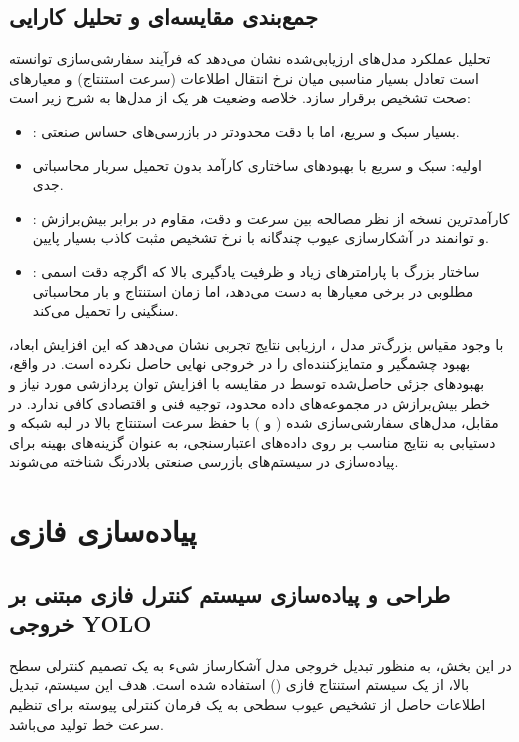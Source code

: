 \documentclass[a4paper, 10pt, twocolumn]{article}
\begin{document}
	
	\subsection{جمع‌بندی مقایسه‌ای و تحلیل کارایی}
	
	تحلیل عملکرد مدل‌های ارزیابی‌شده نشان می‌دهد که فرآیند سفارشی‌سازی توانسته است تعادل بسیار مناسبی میان نرخ انتقال اطلاعات (سرعت استنتاج) و معیارهای صحت تشخیص برقرار سازد. خلاصه‌ وضعیت هر یک از مدل‌ها به شرح زیر است:
	\begin{itemize}
		\item {}: بسیار سبک و سریع، اما با دقت محدودتر در بازرسی‌های حساس صنعتی.
		\item {} اولیه: سبک و سریع با بهبودهای ساختاری کارآمد بدون تحمیل سربار محاسباتی جدی.
		\item {}: کارآمدترین نسخه از نظر مصالحه بین سرعت و دقت، مقاوم در برابر بیش‌برازش و توانمند در آشکارسازی عیوب چندگانه با نرخ تشخیص مثبت کاذب بسیار پایین.
		\item {}: ساختار بزرگ با پارامترهای زیاد و ظرفیت یادگیری بالا که اگرچه دقت اسمی مطلوبی در برخی معیارها به دست می‌دهد، اما زمان استنتاج و بار محاسباتی سنگینی را تحمیل می‌کند.
	\end{itemize}
	
	با وجود مقیاس بزرگ‌تر مدل ، ارزیابی نتایج تجربی نشان می‌دهد که این افزایش ابعاد، بهبود چشمگیر و متمایزکننده‌ای را در خروجی نهایی حاصل نکرده است. در واقع، بهبودهای جزئی حاصل‌شده توسط  در مقایسه با افزایش توان پردازشی مورد نیاز و خطر بیش‌برازش در مجموعه‌های داده محدود، توجیه فنی و اقتصادی کافی ندارد. در مقابل، مدل‌های سفارشی‌سازی شده ( و ) با حفظ سرعت استنتاج بالا در لبه شبکه و دستیابی به نتایج مناسب بر روی داده‌های اعتبارسنجی، به عنوان گزینه‌های بهینه برای پیاده‌سازی در سیستم‌های بازرسی صنعتی بلادرنگ شناخته می‌شوند.
	
	
	
	
	\section{پیاده‌سازی فازی}
	\subsection{طراحی و پیاده‌سازی سیستم کنترل فازی مبتنی بر خروجی YOLO}
	
	در این بخش، به منظور تبدیل خروجی مدل آشکارساز شیء به یک تصمیم کنترلی سطح بالا، از یک سیستم استنتاج فازی () استفاده شده است. هدف این سیستم، تبدیل اطلاعات حاصل از تشخیص عیوب سطحی به یک فرمان کنترلی پیوسته برای تنظیم سرعت خط تولید می‌باشد.
	
\end{document}

